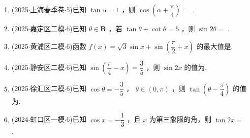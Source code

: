 \begin{enumerate}
    \item (2025$\cdot$上海春季卷$\cdot$5)已知 $\tan \alpha  = 1$ ，则 $\cos \left( {\alpha  + \dfrac{\pi }{4}}\right)  =$ .

    \item (2025$\cdot$嘉定区二模$\cdot$6)已知 $\theta  \in  \mathbf{R}$ ，若 $\tan \theta  + \cot \theta  = 5$ ，则 $\sin {2\theta } =$ .

    \item (2025$\cdot$黄浦区二模$\cdot$6)函数 $f\left( x\right)  = \sqrt{3}\sin x + \sin \left( {\dfrac{\pi }{2} + x}\right)$ 的最大值是.

    \item (2025$\cdot$静安区二模$\cdot$6)已知 $\sin \left( {\dfrac{\pi }{4} - x}\right)  = \dfrac{3}{5}$ ，则 $\sin {2x}$ 的值为.

    \item (2025$\cdot$徐汇区二模$\cdot$6)已知 $\cos \theta  =  - \dfrac{3}{5}$ ， $\theta  \in  \left( {0,\pi }\right)$ ，则 $\tan \left( {\theta  - \dfrac{\pi }{4}}\right)$ 的值为.

    \item (2024$\cdot$虹口区一模$\cdot$6)已知 $\cos x =  - \dfrac{1}{3}$ ，且 $x$ 为第三象限的角，则 $\tan {2x} =$ .
\end{enumerate}

